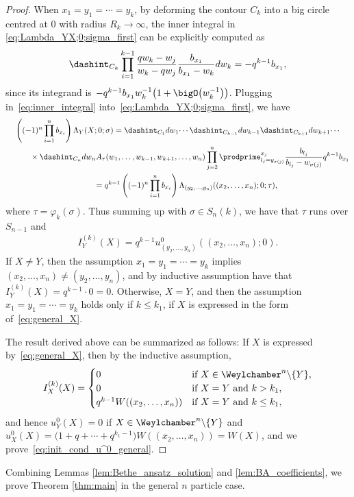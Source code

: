 \begin{proof}
 When $x_1 = y_1 = \dotsb = y_k$, by deforming the contour $C_k$ into a big circle centred at $0$ with radius $R_k \to \infty$, the inner integral in \eqref{eq:Lambda_YX;0;sigma_first} can be explicitly computed as
 \begin{gather} \label{eq:inner_integral}
 \dashint_{C_k} \prod^{k - 1}_{i = 1} \frac{q w_k - w_j}{w_k - q w_j} \frac{b_{x_1}}{b_{x_1} - w_k} dw_k = -q^{k - 1} b_{x_1},
 \end{gather}
 since its integrand is $-q^{k - 1} b_{x_1} w^{-1}_k \big(1 + \bigO\big(w^{-1}_k\big)\big)$. Plugging in~\eqref{eq:inner_integral} into~\eqref{eq:Lambda_YX;0;sigma_first}, we have
 \begin{gather}
   \left( (-1)^n \prod^n_{i = 1} b_{x_i} \right) \Lambda_Y(X; 0; \sigma)
 =  \dashint_{C_1} dw_1 \dotsi \dashint_{C_{k - 1}} dw_{k - 1} \dashint_{C_{k + 1}} dw_{k + 1} \dotsi \nonumber\\
 \qquad\quad{}\times \dashint_{C_n} dw_n A_{\tau}(w_1, \dotsc, w_{k - 1}, w_{k + 1}, \dotsc, w_n)  \prod^n_{j = 2} \prodprime^{x_j}_{l_j = y_{\sigma(j)}} \frac{b_{l_j}}{b_{l_j} - w_{\sigma(j)}} q^{k - 1} b_{x_1} \nonumber\\
\qquad{}
 =  q^{k - 1} \left( (-1)^n \prod^n_{i = 1} b_{x_i} \right) \Lambda_{(y_2, \dotsc, y_n)}((x_2, \dotsc, x_n); 0; \tau),\label{eq:evanluation_x_1=y_k}
  \end{gather}
 where $\tau = \varphi_k(\sigma)$. Thus summing up with $\sigma \in S_n(k)$, we have that $\tau$ runs over $S_{n - 1}$ and
 \begin{gather*} %
 I^{(k)}_Y(X) = q^{k - 1} u^0_{(y_2, \dotsc, y_n)}((x_2, \dotsc, x_n); 0).
 \end{gather*}
 If $X \neq Y$, then the assumption $x_1 = y_1 = \dotsb = y_k$ implies $(x_2, \dotsc, x_n) \neq (y_2, \dotsc, y_n)$, and by inductive assumption have that $I^{(k)}_Y(X) = q^{k - 1} \cdot 0 = 0$. Otherwise, $X = Y$, and then the assumption $x_1 = y_1 = \dotsb = y_k$ holds only if $k \leq k_1$, if $X$ is expressed in the form of~\eqref{eq:general_X}.

 The result derived above can be summarized as follows: If $X$ is expressed by~\eqref{eq:general_X}, then by the inductive assumption,
 \begin{gather*}
 I^{(k)}_X(X) =
 \begin{cases}
 0 & \text{if $X \in \Weylchamber^n {\setminus} \{ Y \}$}, \\
 0 & \text{if $X = Y$ and $k > k_1$}, \\
 q^{k - 1} W((x_2, \dotsc, x_n)) & \text{if $X = Y$ and $k \leq k_1$},
 \end{cases}
 \end{gather*}
 and hence $u^0_Y(X) = 0$ if $X \in \Weylchamber^n {\setminus} \{ Y \}$ and $u^0_X(X) = \big(1 + q + \dotsb + q^{k_1 - 1}\big) W((x_2, \dotsc, x_n)) = W(X)$, and we prove~\eqref{eq:init_cond_u^0_general}.
\end{proof}

Combining Lemmas \ref{lem:Bethe_ansatz_solution} and \ref{lem:BA_coefficients}, we prove Theorem \ref{thm:main} in the general $n$ particle case.
